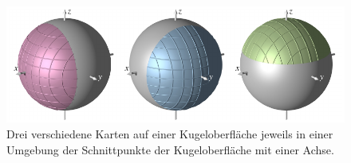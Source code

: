 %
%
\begin{figure}
\centering
\includegraphics{chapters/030-gruppen/images/kugelkarten.pdf}
\caption{Drei verschiedene Karten auf einer Kugeloberfläche jeweils in
einer Umgebung der Schnittpunkte der Kugeloberfläche mit einer
Achse.
\label{buch:gruppen:gruppe:fig:kugelkarten}}
\end{figure}
